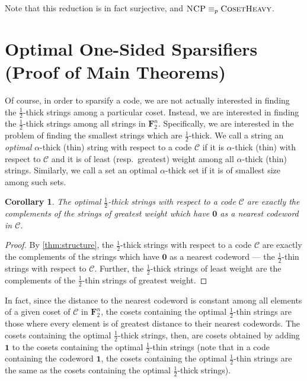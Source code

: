 \documentclass{article}
\newtheorem{corollary}{Corollary}
\newcommand{\FF}{\mathbf{F}}
\newcommand{\NCP}{\textsc{NCP}}
\newcommand{\CosetHeavy}{\textsc{Coset\-Heavy}}
\newcommand{\calC}{\mathcal{C}}
\begin{document}
Note that this reduction is in fact surjective, and ${\NCP} \equiv_p {\CosetHeavy}$.

\section{Optimal One-Sided Sparsifiers (Proof of Main Theorems)}\label{sec:main}
Of course, in order to sparsify a code, we are not actually interested in finding the $\frac12$-thick strings among a particular coset. Instead,  we are interested in finding the $\frac12$-thick strings among all strings in $\FF_2^n$. Specifically, we are interested in the problem of finding the smallest strings which are $\frac12$-thick. We call a string an \textit{optimal} $\alpha$-thick (thin) string with respect to a code $\calC$ if it is $\alpha$-thick (thin) with respect to $\calC$ and it is of least (resp.\ greatest) weight among all $\alpha$-thick (thin) strings. Similarly, we call a set an optimal $\alpha$-thick set if it is of smallest size among such sets.

\begin{corollary}
    The optimal $\frac12$-thick strings with respect to a code $\calC$ are exactly the complements of the strings of greatest weight which have $\mathbf{0}$ as a nearest codeword in $\calC$.
\end{corollary}
\begin{proof}
By \cref{thm:structure}, the $\frac12$-thick strings with respect to a code $\calC$ are exactly the complements of the strings which have $\mathbf{0}$ as a nearest codeword --- the $\frac12$-thin strings with respect to $\calC$. Further, the $\frac12$-thick strings of least weight are the complements of the $\frac12$-thin strings of greatest weight.
\end{proof}

In fact, since the distance to the nearest codeword is constant among all elements of a given coset of $\calC$ in $\FF_2^n$, the cosets containing the optimal $\frac12$-thin strings are those where every element is of greatest distance to their nearest codewords. The cosets containing the optimal $\frac12$-thick strings, then, are cosets obtained by adding $\mathbf{1}$ to the cosets containing the optimal $\frac12$-thin strings (note that in a code containing the codeword $\mathbf{1}$, the cosets containing the optimal $\frac12$-thin strings are the same as the cosets containing the optimal $\frac12$-thick strings).
\end{document}
